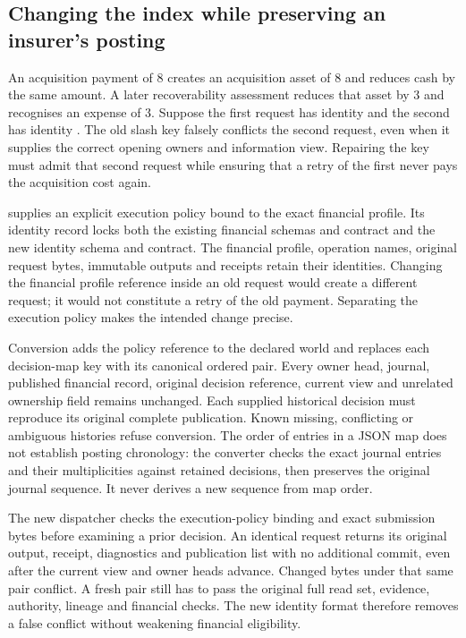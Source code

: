 \subsection{Changing the index while preserving an insurer's posting}
\label{sec:insurance-identity-adoption}

An acquisition payment of 8 creates an acquisition asset of 8 and reduces cash
by the same amount. A later recoverability assessment reduces that asset by 3
and recognises an expense of 3. Suppose the first request has identity
 and the second has identity .
The old slash key falsely conflicts the second request, even when it supplies
the correct opening owners and information view. Repairing the key must admit
that second request while ensuring that a retry of the first never pays the
acquisition cost again.

 supplies an explicit execution policy
bound to the exact  financial profile. Its identity
record locks both the existing financial schemas and contract and the new
identity schema and contract. The financial profile, operation names, original
request bytes, immutable outputs and receipts retain their identities. Changing
the financial profile reference inside an old request would create a different
request; it would not constitute a retry of the old payment. Separating the
execution policy makes the intended change precise.

Conversion adds the policy reference to the declared world and replaces each
decision-map key with its canonical ordered pair. Every owner head, journal,
published financial record, original decision reference, current view and
unrelated ownership field remains unchanged. Each supplied historical decision
must reproduce its original complete publication. Known missing, conflicting
or ambiguous histories refuse conversion. The order of entries in a JSON map
does not establish posting chronology: the converter checks the exact journal
entries and their multiplicities against retained decisions, then preserves
the original journal sequence. It never derives a new sequence from map order.

The new dispatcher checks the execution-policy binding and exact submission
bytes before examining a prior decision. An identical request returns its
original output, receipt, diagnostics and publication list with no additional
commit, even after the current view and owner heads advance. Changed bytes under
that same pair conflict. A fresh pair still has to pass the original full read
set, evidence, authority, lineage and financial checks. The new identity format
therefore removes a false conflict without weakening financial eligibility.

